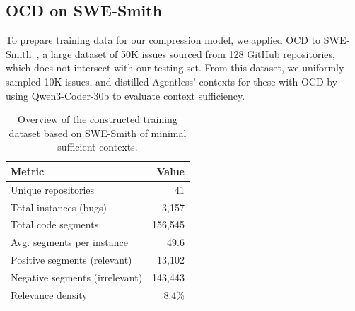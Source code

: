 \documentclass[sigconf,nonacm]{acmart}
\newcommand{\haoxiang}[1]{{\color{red}\textbf{(Haoxiang:} #1\textbf{)}}}
\begin{document}


\subsection{OCD on SWE-Smith}
\label{sec:characteristics_of_distilled_data}

To prepare training data for our compression model, we applied OCD to SWE-Smith~\cite{yang2025swe}, a large dataset of 50K issues sourced from 128 GitHub repositories, which does not intersect with our testing set. From this dataset, we uniformly sampled 10K issues, and distilled Agentless' contexts for these with OCD by using Qwen3-Coder-30b to evaluate context sufficiency. 

\begin{table}
\caption{Overview of the constructed training dataset based on SWE-Smith of minimal sufficient contexts.}
\label{tab:dataset_overview}
\vspace{-1mm}
\begin{tabular}{lr}
\toprule
Metric & Value \\
\midrule
Unique repositories & 41 \\
Total instances (bugs) & 3,157 \\
Total code segments & 156,545 \\
Avg. segments per instance & 49.6 \\
Positive segments (relevant) & 13,102 \\
Negative segments (irrelevant) & 143,443 \\
Relevance density & 8.4\% \\
\bottomrule
\end{tabular}
\vspace{-1mm}
\end{table}

\end{document}
